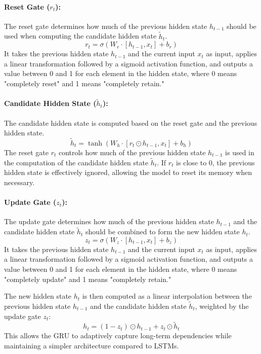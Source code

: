 \paragraph{Reset Gate ($r_t$):}
The reset gate determines how much of the previous hidden state $h_{t-1}$ should be used when computing the candidate hidden state $\tilde{h}_t$.
\begin{equation}
    r_t = \sigma\left(W_r \cdot [h_{t-1}, x_t] + b_r\right)
\end{equation}
It takes the previous hidden state $h_{t-1}$ and the current input $x_t$ as input, applies a linear transformation followed by a sigmoid activation function,
and outputs a value between 0 and 1 for each element in the hidden state, where 0 means "completely reset" and 1 means "completely retain."

\paragraph{Candidate Hidden State ($\tilde{h}_t$):}
The candidate hidden state is computed based on the reset gate and the previous hidden state.
\begin{equation}
    \tilde{h}_t = \tanh\left(W_h \cdot [r_t \odot h_{t-1}, x_t] + b_h\right)
\end{equation}
The reset gate $r_t$ controls how much of the previous hidden state $h_{t-1}$ is used in the computation of the candidate hidden state $\tilde{h}_t$.
If $r_t$ is close to 0, the previous hidden state is effectively ignored, allowing the model to reset its memory when necessary.

\paragraph{Update Gate ($z_t$):}
The update gate determines how much of the previous hidden state $h_{t-1}$ and the candidate hidden state $\tilde{h}_t$ should be 
combined to form the new hidden state $h_t$.
\begin{equation}
    z_t = \sigma\left(W_z \cdot [h_{t-1}, x_t] + b_z\right)
\end{equation}
It takes the previous hidden state $h_{t-1}$ and the current input $x_t$ as input, applies a linear transformation followed by a sigmoid activation function,
and outputs a value between 0 and 1 for each element in the hidden state, where 0 means "completely update" and 1 means "completely retain."

The new hidden state $h_t$ is then computed as a linear interpolation between the previous hidden state $h_{t-1}$ and the candidate hidden state $\tilde{h}_t$,
weighted by the update gate $z_t$:
\begin{equation}
    h_t = (1 - z_t) \odot h_{t-1} + z_t \odot \tilde{h}_t
\end{equation}
This allows the GRU to adaptively capture long-term dependencies while maintaining a simpler architecture compared to LSTMs. 


